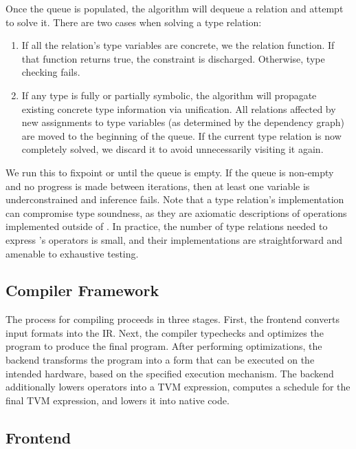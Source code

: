 Once the queue is populated, the algorithm will dequeue a relation and attempt to solve it.
There are two cases when solving a type relation:
\begin{enumerate}
  \item If all the relation's type variables
  are concrete, we the relation function. If that function returns true, the
  constraint is discharged. Otherwise, type checking fails.
  \item If any type is fully or partially symbolic, the
    algorithm will propagate
    existing concrete type information via unification.
  All relations affected by new assignments to type
    variables (as determined by the dependency graph)
    are moved to the beginning of the queue.
  If the current type relation is now completely solved, we
  discard it to avoid unnecessarily visiting it again.
\end{enumerate}

We run this to fixpoint or until the queue is empty.
If the queue is non-empty and no progress is made between iterations,
  then at least one variable is underconstrained and inference fails.
Note that a type relation's implementation can
  compromise type soundness, as they are axiomatic descriptions
  of operations implemented outside of \relay.
In practice, the number of type relations needed to express \relay's
  operators is small, and their implementations are straightforward
  and amenable to exhaustive testing.

\subsection{Compiler Framework}

The process for compiling \relay proceeds in three stages.
First, the frontend converts input formats into the \relay IR.
Next, the \relay compiler typechecks and optimizes the program
  to produce the final program.
After performing optimizations,
  the \relay backend transforms
  the \relay program into a form that can be executed on
  the intended hardware, based on the specified execution mechanism.
The backend additionally lowers \relay operators into a TVM expression,
  computes a schedule for the final TVM expression, and lowers it into
  native code.

\subsection*{Frontend}

